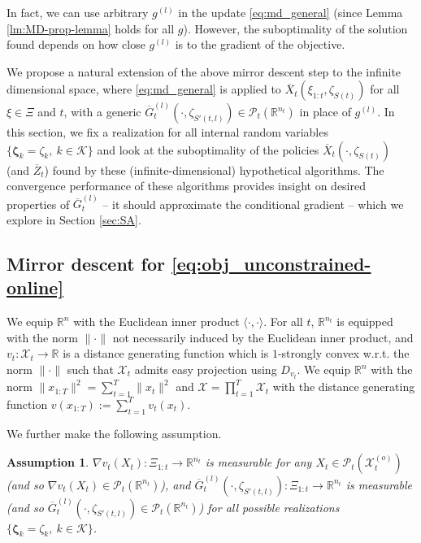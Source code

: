 \documentclass[11pt,fullpage,letterpaper]{article}
\newcommand{\mc}{\mathcal}
\newcommand{\R}{\mathbb{R}}
\newcommand{\bz}{\boldsymbol{\zeta}}
\newtheorem{assumption}{Assumption}[section]
\begin{document}
In fact, we can use arbitrary $g^{(l)}$ in the update \eqref{eq:md_general} (since Lemma \ref{lm:MD-prop-lemma} holds for all $g$). However, the suboptimality of the solution found depends on how close $g^{(l)}$ is to the gradient of the objective. 




We propose a natural extension of the above mirror descent step to the infinite dimensional space, where \eqref{eq:md_general} is applied to $\overline{X}_t(\xi_{1:t},\zeta_{S(t)})$ for all $\xi\in \Xi$ and $t$, with a generic $\overline{G}_t^{(l)}(\cdot,\zeta_{S'(t,l)})\in \mc P_t(\R^{n_t})$ in place of $g^{(l)}$. In this section, we fix a realization for all  internal random variables $\{\bz_k = \zeta_k,~k\in \mc K\}$ and look at the suboptimality of the policies $\overline{X}_t(\cdot,\zeta_{S(t)})$ (and $\overline{Z}_t$) found by these (infinite-dimensional) hypothetical algorithms. The convergence performance of these algorithms provides insight on desired properties of $\overline{G}_t^{(l)}$ -- it should approximate the conditional gradient -- which we explore in Section \ref{sec:SA}. 








\subsection{Mirror descent for \eqref{eq:obj_unconstrained-online}}\label{sec:md_unconstraint}

We equip $\R^{n}$ with the Euclidean inner product $\langle \cdot,\cdot \rangle$. For all $t$, $\R^{n_t}$ is equipped with the norm $\|\cdot\|$ not necessarily induced by the Euclidean inner product, and $v_t:\mc X_t\to \R$ is a distance generating function which is $1$-strongly convex w.r.t. the norm $\|\cdot \|$ such that $\mc X_t$ admits easy projection using $D_{v_t}$. We equip $\R^n$ with the norm $ \|x_{1:T}\|^2 = \sum_{t=1}^T \|x_t\|^2$ and $\mc X=\prod_{t=1}^T \mc X_t$ with the distance generating function $v(x_{1:T}):=\sum_{t=1}^T v_t(x_t)$. 

We further make the following assumption.
\begin{assumption}\label{assumption:measurable}
     $\nabla v_t(X_t):\Xi_{1:t}\to \R^{n_t}$ is measurable for any $X_t\in \mc P_t(\mc X_t^{(o)})$ (and so $\nabla v_t(X_t)\in \mc P_t(\R^{n_t})$), and $\overline{G}_t^{(l)}(\cdot,\zeta_{S'(t,l)}):\Xi_{1:t}\to \R^{n_t}$ is measurable (and so $\overline{G}_t^{(l)}(\cdot,\zeta_{S'(t,l)})\in  \mc P_t(\R^{n_t})$) for all possible realizations $\{\bz_k = \zeta_{k},~k\in \mc K\}$.
\end{assumption}
\end{document}
